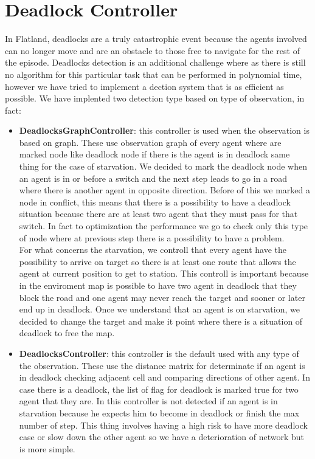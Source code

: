 \section{Deadlock Controller}
In Flatland, deadlocks are a truly catastrophic event because the agents involved can no longer move and are an obstacle to those free to navigate for the rest of the episode. Deadlocks detection is an additional challenge where as there is still no algorithm for this particular task that can be performed in polynomial time, however we have tried to implement a dection system that is as efficient as possible. We have implented two detection type based on type of observation, in fact:
\begin{itemize}
	\item \textbf{DeadlocksGraphController}: this controller is used when the observation is based on graph. These use observation graph of every agent where are marked node like deadlock node if there is the agent is in deadlock same thing for the case of starvation. 
	We decided to mark the deadlock node when an agent is in or before a switch and the next step leads to go in a road where there is another agent in opposite direction. Before of this we marked a node in conflict, this means that there is a possibility to have a deadlock situation because there are at least two agent that they must pass for that switch. In fact to optimization the performance we go to check only this type of node where at previous step there is a possibility to have a problem.\\
	For what concerns the starvation, we controll that every agent have the possibility to arrive on target so there is at least one route that allows the agent at current position to get to station. This controll is important because in the enviroment map is possible to have two agent in deadlock that they block the road and one agent may never reach the target and sooner or later end up in deadlock. Once we understand that an agent is on starvation, we decided to change the target and make it point where there is a situation of deadlock to free the map.	
	\item \textbf{DeadlocksController}: this controller is the default used with any type of the observation. These use the distance matrix for determinate if an agent is in deadlock checking adjacent cell and comparing directions of other agent. In case there is a deadlock, the list of flag for deadlock is marked true for two agent that they are. In this controller is not detected if an agent is in starvation because he expects him to become in deadlock or finish the max number of step. This thing involves having a high risk to have more deadlock case or slow down the other agent so we have a deterioration of network but is more simple. 
\end{itemize}	
